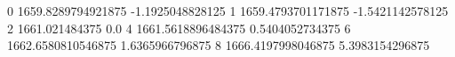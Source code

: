 0 1659.8289794921875 -1.1925048828125
1 1659.4793701171875 -1.5421142578125
2 1661.021484375 0.0
4 1661.5618896484375 0.5404052734375
6 1662.6580810546875 1.6365966796875
8 1666.4197998046875 5.3983154296875
